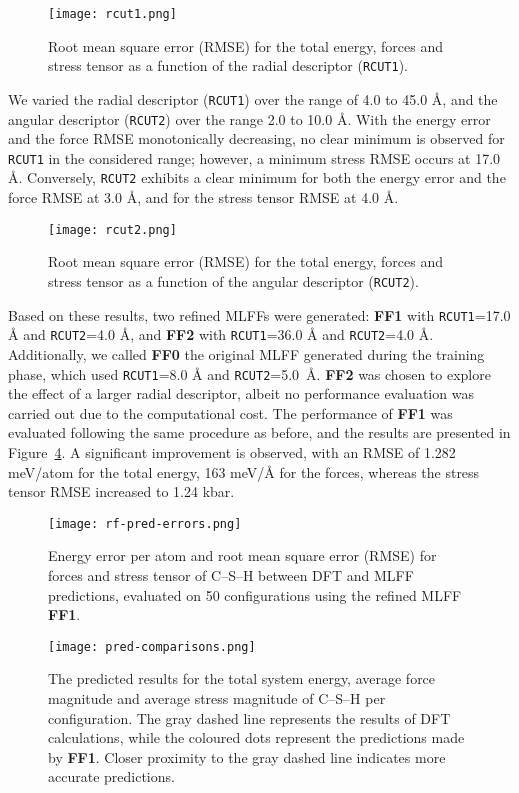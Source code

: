 \begin{figure}[h]
    \centering
    \texttt{[image: rcut1.png]}
    \caption{
    Root mean square error (RMSE) for the total energy, forces and stress tensor as a function of the radial descriptor (\texttt{RCUT1}). 
    }
    \label{rcut1}
\end{figure}
We varied the radial descriptor (\texttt{RCUT1}) over the range of 4.0 to 45.0 Å, and the angular descriptor (\texttt{RCUT2}) over the range 2.0 to 10.0 Å. With the energy error and the force RMSE monotonically decreasing, no clear minimum is observed for \texttt{RCUT1} in the considered range; however, a minimum stress RMSE occurs at 17.0 \AA. Conversely, \texttt{RCUT2} exhibits a clear minimum for both the energy error and the force RMSE at 3.0 \AA, and for the stress tensor RMSE at 4.0 \AA.
\begin{figure}[h]
    \centering
    \texttt{[image: rcut2.png]}
    \caption{
    Root mean square error (RMSE) for the total energy, forces and stress tensor as a function of the angular descriptor (\texttt{RCUT2}).
    }
    \label{rcut2}
\end{figure}
Based on these results, two refined MLFFs were generated: \textbf{FF1} with \texttt{RCUT1}=17.0 \AA{} and \texttt{RCUT2}=4.0 \AA, and \textbf{FF2} with \texttt{RCUT1}=36.0 \AA{} and \texttt{RCUT2}=4.0 \AA{}. Additionally, we called \textbf{FF0} the original MLFF generated during the training phase, which used \texttt{RCUT1}=8.0 \AA{} and \texttt{RCUT2}=5.0~\AA. \textbf{FF2} was chosen to explore the effect of a larger radial descriptor, albeit no performance evaluation was carried out due to the computational cost. 
The performance of \textbf{FF1} was evaluated following the same procedure as before, and the results are presented in Figure~\ref{rf-pred-errors}. A significant improvement is observed, with an RMSE of 1.282 meV/atom for the total energy, 163 meV/\AA{} for the forces, whereas the stress tensor RMSE increased to 1.24 kbar.
\begin{figure}[h]
    \centering
    \texttt{[image: rf-pred-errors.png]}
    \caption{
    Energy error per atom and root mean square error (RMSE) for forces and stress tensor of C--S--H between DFT and MLFF predictions, evaluated on 50 configurations using the refined MLFF \textbf{FF1}.  
    }
    \label{rf-pred-errors}
\end{figure}
\begin{figure}[h]
    \centering
    \texttt{[image: pred-comparisons.png]}
    \caption{
    The predicted results for the total system energy, average force magnitude and average stress magnitude of C--S--H per configuration. The gray dashed line represents the results of DFT calculations, while the coloured dots represent the predictions made by \textbf{FF1}. Closer proximity to the gray dashed line indicates more accurate predictions.  
    }
    \label{rf-pred-errors}
\end{figure}
